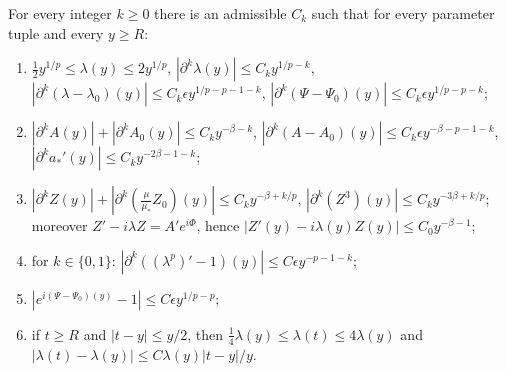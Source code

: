 \begin{lemma}
  \label{lem:c05_symbol_bounds}
  For every integer $k\ge0$ there is an admissible $C_k$ such that for every parameter tuple and every $y\ge R$:
  \begin{enumerate}
    \item $\frac12y^{1/p}\le\lambda(y)\le2y^{1/p}$, $|\partial^k\lambda(y)|\le C_ky^{1/p-k}$,
      $|\partial^k(\lambda-\lambda_0)(y)|\le C_k\epsilon y^{1/p-p-1-k}$,
      $|\partial^k(\Psi-\Psi_0)(y)|\le C_k\epsilon y^{1/p-p-k}$;
    \item $|\partial^kA(y)|+|\partial^kA_0(y)|\le C_ky^{-\beta-k}$, $|\partial^k(A-A_0)(y)|\le C_k\epsilon y^{-\beta-p-1-k}$,
      $|\partial^ka_*'(y)|\le C_ky^{-2\beta-1-k}$;
    \item $|\partial^kZ(y)|+|\partial^k(\tfrac{\mu}{\mu_*}Z_0)(y)|\le C_ky^{-\beta+k/p}$, $|\partial^k(Z^3)(y)|\le C_ky^{-3\beta+k/p}$;
      moreover $Z'-i\lambda Z=A'e^{i\Phi}$, hence $|Z'(y)-i\lambda(y)Z(y)|\le C_0y^{-\beta-1}$;
    \item for $k\in\{0,1\}$: $|\partial^k((\lambda^p)'-1)(y)|\le C\epsilon y^{-p-1-k}$;
    \item $|e^{i(\Psi-\Psi_0)(y)}-1|\le C\epsilon y^{1/p-p}$;
    \item if $t\ge R$ and $|t-y|\le y/2$, then $\frac14\lambda(y)\le\lambda(t)\le4\lambda(y)$ and
      $|\lambda(t)-\lambda(y)|\le C\lambda(y)|t-y|/y$.
  \end{enumerate}
\end{lemma}
